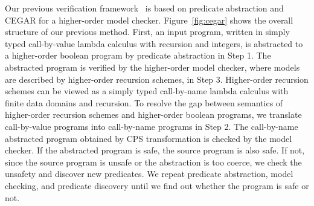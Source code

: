 Our previous verification framework~\cite{KobayashiPLDI2011} is based on
predicate abstraction and CEGAR for a higher-order model checker.
Figure~\ref{fig:cegar} shows the overall structure of our previous
method.  First, an input program, written in simply typed call-by-value
lambda calculus with recursion and integers, is abstracted to a higher-order boolean
program by predicate abstraction in Step 1.  The abstracted program is
verified by the higher-order model checker, where models are described by
higher-order recursion schemes, in Step 3.  Higher-order recursion
schemes can be viewed as a simply typed call-by-name lambda calculus
with finite data domains and recursion.  To resolve the gap between
semantics of higher-order recursion schemes and higher-order boolean
programs, we translate call-by-value programs into call-by-name programs
in Step 2.  The call-by-name abstracted program obtained by CPS
transformation is checked by the model checker. If the abstracted
program is safe, the source program is also safe.  If not, since the
source program is unsafe or the abstraction is too coerce, we check the
unsafety and discover new predicates.  We repeat predicate abstraction,
model checking, and predicate discovery until we find out whether the
program is safe or not.

